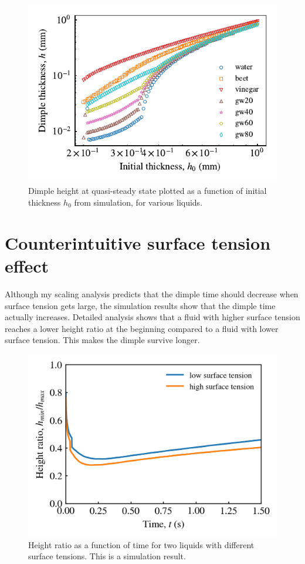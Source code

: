 \documentclass[aps,preprint]{revtex4-2}
\begin{document}
\begin{figure}[ht]
    \centering
    \includegraphics[width=\linewidth]{Figures/dimple_thickness}
    \caption{
    Dimple height at quasi-steady state plotted as a function of initial thickness $h_0$ from simulation, for various liquids. 
    }
    \label{fig:dimple-thickness-relation}
\end{figure}

\newpage

\section{Counterintuitive surface tension effect}

Although my scaling analysis predicts that the dimple time should decrease when surface tension gets large, the simulation results show that the dimple time actually increases. Detailed analysis shows that a fluid with higher surface tension reaches a lower height ratio at the beginning compared to a fluid with lower surface tension. This makes the dimple survive longer.

\begin{figure}[ht]
    \centering
    \includegraphics[width=\linewidth]{Figures/surface_tension_effect.png}
    \caption{
    Height ratio as a function of time for two liquids with different surface tensions. This is a simulation result.
    }
    \label{fig:surface-tension-effect}
\end{figure}
\end{document}
